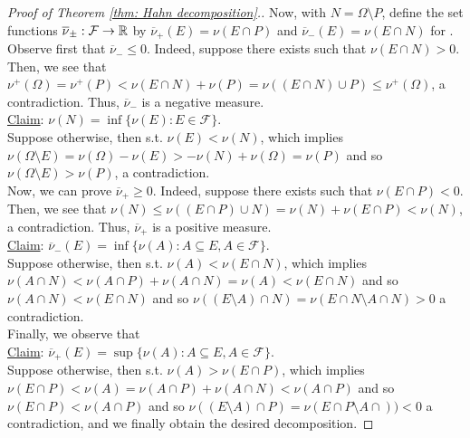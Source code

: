 \documentclass{article}
\begin{document}
\begin{proof}[Proof of Theorem \ref{thm: Hahn decomposition}.]
Now, with $N=\Omega\setminus P$, define the set functions $\overline{\nu}_{\pm}:\mathcal{F}\to \mathbb{R}$ by $\overline{\nu}_+(E)=\nu(E\cap P)$ and $\overline{\nu}_-(E)=\nu(E\cap N)$ for .\\ 

Observe first that $\overline{\nu}_-\leq 0$. Indeed, suppose there exists  such that $\nu(E\cap N)>0$. Then, 
we see that $\nu^+(\Omega) = \nu^+(P)<\nu(E\cap N)+\nu(P)=\nu((E\cap N) \displaystyle\cup P)\leq \nu^+(\Omega)$, a contradiction. Thus, $\overline{\nu}_-$ is a negative measure.\\

\noindent\underline{Claim}: 
$\nu(N) = \inf \{\nu(E):E\in\mathcal{F}\}$.\\

Suppose otherwise, then \isthere {} s.t. $\nu(E)<\nu(N)$, which implies $\nu(\Omega\setminus E)=\nu(\Omega)-\nu(E)>-\nu(N)+\nu(\Omega)=\nu(P)$ and so $\nu(\Omega\setminus E)>\nu(P)$, a contradiction.\\

Now, we can prove $\overline{\nu}_+\geq 0$. Indeed, suppose there exists  such that $\nu(E\cap P)<0$. Then, 
we see that $\nu(N) \leq \nu((E\cap P) \displaystyle\cup N)=\nu(N)+\nu(E\cap P)<\nu(N)$, a contradiction. Thus, $\overline{\nu}_+$ is a positive measure.\\

\noindent\underline{Claim}: 
$\overline{\nu}_-(E) = \inf \{\nu(A):A\subseteq E, A\in\mathcal{F}\}$.\\

Suppose otherwise, then \isthere {} s.t. $\nu(A)<\nu(E\cap N)$, which implies $\nu(A \cap N)<\nu(A\cap P)+\nu(A \cap N)=\nu(A)<\nu(E \cap N)$ and so $\nu(A \cap N)<\nu(E \cap N)$ and so $\nu((E\setminus A)\cap N)=\nu(E\cap N\setminus A\cap N)>0$ a contradiction.
\\

Finally, we observe that \\

\noindent\underline{Claim}: 
$\overline{\nu}_+(E) = \sup \{\nu(A):A\subseteq E, A\in\mathcal{F}\}$.\\

Suppose otherwise, then \isthere {} s.t. $\nu(A)>\nu(E\cap P)$, which implies $\nu(E \cap P)<\nu(A) = \nu(A\cap P)+\nu(A \cap N)<\nu(A \cap P)$ and so $\nu(E \cap P)<\nu(A \cap P)$ and so $\nu((E\setminus A)\cap P)=\nu(E\cap P\setminus A\cap ))<0$ a contradiction, and we finally obtain the desired decomposition.
\end{proof}
\end{document}
